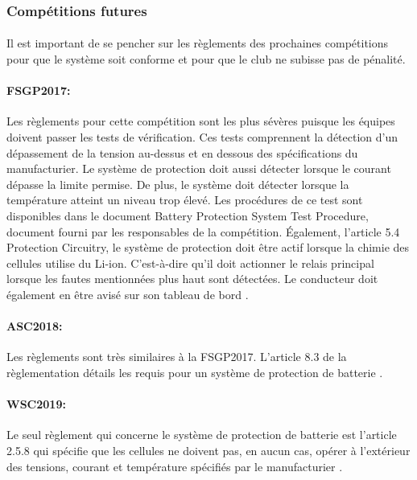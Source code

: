 	\subsubsection{Compétitions futures}
	
		\paragraph{}
		Il est important de se pencher sur les règlements des prochaines compétitions pour que le système soit conforme et pour que le club ne subisse pas de pénalité.
	
		\paragraph{FSGP2017:}
		Les règlements pour cette compétition sont les plus sévères puisque les équipes doivent passer les tests de vérification. Ces tests comprennent la détection d'un dépassement de la tension au-dessus et en dessous des spécifications du manufacturier. Le système de protection doit aussi détecter lorsque le courant dépasse la limite permise. De plus, le système doit détecter lorsque la température atteint un niveau trop élevé. Les procédures de ce test sont disponibles dans le document Battery Protection System Test Procedure, document fourni par les responsables de la compétition. Également, l'article 5.4 Protection Circuitry, le système de protection doit être actif lorsque la chimie des cellules utilise du Li-ion. C'est-à-dire qu'il doit actionner le relais principal lorsque les fautes mentionnées plus haut sont détectées. Le conducteur doit également en être avisé sur son tableau de bord \cite{reg_fsgp2017}. 
		
		\paragraph{ASC2018:}
		Les règlements sont très similaires à la FSGP2017. L'article 8.3 de la règlementation détails les requis pour un système de protection de batterie \cite{reg_asc2018}.
		
		\paragraph{WSC2019:}
		Le seul règlement qui concerne le système de protection de batterie est l'article 2.5.8 qui spécifie que les cellules ne doivent pas, en aucun cas, opérer à l'extérieur des tensions, courant et température spécifiés par le manufacturier \cite{reg_wsc2017}.